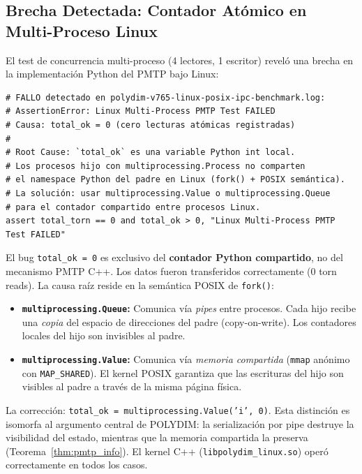 \subsection{Brecha Detectada: Contador Atómico en Multi-Proceso Linux}

El test de concurrencia multi-proceso (4 lectores, 1 escritor) reveló una brecha
en la implementación Python del PMTP bajo Linux:

\begin{lstlisting}[style=pythonstyle, caption={Bug: assert total\_ok > 0 falla porque el contador atómico de Linux no se propaga entre procesos Python}]
# FALLO detectado en polydim-v765-linux-posix-ipc-benchmark.log:
# AssertionError: Linux Multi-Process PMTP Test FAILED
# Causa: total_ok = 0 (cero lecturas atómicas registradas)
#
# Root Cause: `total_ok` es una variable Python int local.
# Los procesos hijo con multiprocessing.Process no comparten
# el namespace Python del padre en Linux (fork() + POSIX semántica).
# La solución: usar multiprocessing.Value o multiprocessing.Queue
# para el contador compartido entre procesos Linux.
assert total_torn == 0 and total_ok > 0, "Linux Multi-Process PMTP Test FAILED"
\end{lstlisting}

\begin{remark}
\label{rem:linux_fork_bug}
El bug \texttt{total\_ok = 0} es exclusivo del \textbf{contador Python compartido},
no del mecanismo PMTP C++. Los datos fueron transferidos correctamente (0 torn reads).
La causa raíz reside en la semántica POSIX de \texttt{fork()}:

\begin{itemize}
    \item \textbf{\texttt{multiprocessing.Queue}:} Comunica vía \emph{pipes} entre 
    procesos. Cada hijo recibe una \emph{copia} del espacio de direcciones del padre 
    (copy-on-write). Los contadores locales del hijo son invisibles al padre.
    
    \item \textbf{\texttt{multiprocessing.Value}:} Comunica vía \emph{memoria compartida}
    (\texttt{mmap} anónimo con \texttt{MAP\_SHARED}). El kernel POSIX garantiza que las
    escrituras del hijo son visibles al padre a través de la misma página física.
\end{itemize}

La corrección: \texttt{total\_ok = multiprocessing.Value('i', 0)}. Esta distinción
es isomorfa al argumento central de POLYDIM: la serialización por pipe destruye
la visibilidad del estado, mientras que la memoria compartida la preserva
(Teorema~\ref{thm:pmtp_info}). El kernel C++ (\texttt{libpolydim\_linux.so}) operó
correctamente en todos los casos.
\end{remark}

